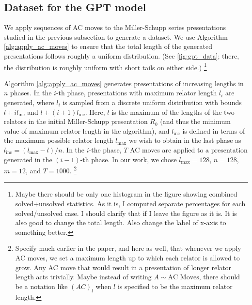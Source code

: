 \subsection{Dataset for the GPT model}

We apply sequences of AC moves to the Miller-Schupp series presentations studied in the previous subsection to generate a dataset.
We use Algorithm \autoref{alg:apply_ac_moves} to ensure that the total length of the generated presentations follows roughly a uniform distribution.
(See \autoref{fig:gpt_data}; there, the distribution is roughly uniform with short tails on either side.)
\footnote{Maybe there should be only one histogram in the figure showing combined solved+unsolved statistics.
As it is, I computed separate percentages for each solved/unsolved case.
I should clarify that if I leave the figure as it is.
It is also good to change the total length.
Also change the label of x-axis to something better.}

Algorithm \autoref{alg:apply_ac_moves} generates presentations of increasing lengths in $n$ phases.
In the $i$-th phase, presentations with maximum relator length $l_i$ are generated, where $l_i$ is sampled from a discrete uniform distribution with bounds $l + i l_{\text{inc}} $ and $l + (i+1) l_{\text{inc}}$.
Here, $l$ is the maximum of the lengths of the two relators in the initial Miller-Schupp presentation $R_0$ (and thus the minimum value of maximum relator length in the algorithm), and $l_{\text{inc}}$ is defined in terms of the maximum possible relator length $l_{\text{max}}$ we wish to obtain in the last phase as $l_{\text{inc}} = (l_{\text{max}}-l)/n$.
In the $i$-the phase, $T$ AC moves are applied to a presentation generated in the $(i-1)$-th phase.
In our work, we chose $l_{\text{max}}=128$, $n=128$, $m=12$, and $T=1000$.
\footnote{Specify much earlier in the paper, and here as well, that whenever we apply AC moves, we set a maximum length up to which each relator is allowed to grow.
Any AC move that would result in a presentation of longer relator length acts trivially.
Maybe instead of writing $A \sim \text{AC Moves}$, there should be a notation like $(AC)_l$ when $l$ is specified to be the maximum relator length.}


